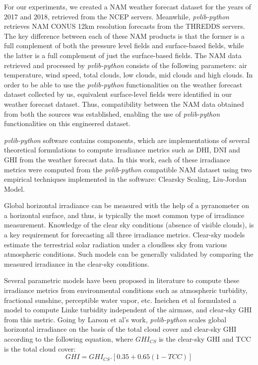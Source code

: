 \par For our experiments, we created a NAM weather forecast dataset for the years of 2017 and 2018, retrieved from the NCEP servers. Meanwhile, \textit{pvlib-python} retrieves NAM CONUS 12km resolution forecasts from the THREDDS servers. The key difference between each of these NAM products is that the former is a full complement of both the pressure level fields and surface-based fields, while the latter is a full complement of just the surface-based fields. The NAM data retrieved and processed by \textit{pvlib-python} consists of the following parameters: air temperature, wind speed, total clouds, low clouds, mid clouds and high clouds. In order to be able to use the \textit{pvlib-python} functionalities on the weather forecast dataset collected by us, equivalent surface-level fields were identified in our weather forecast dataset. Thus, compatibility between the NAM data obtained from both the sources was established, enabling the use of \textit{pvlib-python} functionalities on this engineered dataset.

\par \textit{pvlib-python} software contains components, which are implementations of several theoretical formulations to compute irradiance metrics such as DHI, DNI and GHI from the weather forecast data. In this work, each of these irradiance metrics were computed from the \textit{pvlib-python} compatible NAM dataset using two empirical techniques implemented in the software: Clearsky Scaling, Liu-Jordan Model.

\par Global horizontal irradiance can be measured with the help of a pyranometer on a horizontal surface, and thus, is typically the most common type of irradiance measurement. Knowledge of the clear sky conditions (absence of visible clouds), is a key requirement for forecasting all three irradiance metrics. Clear-sky models estimate the terrestrial solar radiation under a cloudless sky from various atmospheric conditions. Such models can be generally validated by comparing the measured irradiance in the clear-sky conditions. 

\par Several parametric models have been proposed in literature to compute these irradiance metrics from environmental conditions such as atmospheric turbidity, fractional sunshine, perceptible water vapor, etc. Ineichen et al \cite{pvlib_ineichen} formulated a model to compute Linke turbidity independent of the airmass, and clear-sky GHI from this metric. Going by Larson et al's \cite{pvlib_larson} work, \textit{pvlib-python} scales global horizontal irradiance on the basis of the total cloud cover and clear-sky GHI according to the following equation, where $GHI_{CS}$ is the clear-sky GHI and TCC is the total cloud cover:
\begin{equation}\label{eq:ghi_cs}
    GHI = GHI_{CS} . [0.35 + 0.65(1 - TCC)]
\end{equation}

